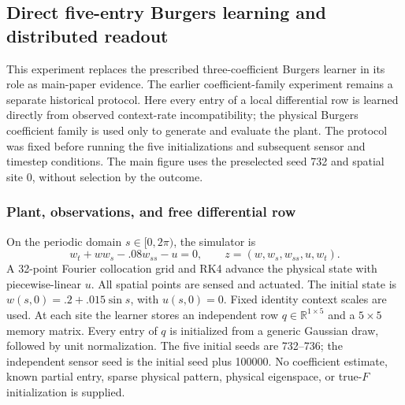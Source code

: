 \subsection{Direct five-entry Burgers learning and distributed readout}
\label{sec:direct_burgers_protocol}

This experiment replaces the prescribed three-coefficient Burgers learner in
its role as main-paper evidence. The earlier coefficient-family experiment
remains a separate historical protocol. Here every entry of a local differential
row is learned directly from observed context-rate incompatibility; the physical
Burgers coefficient family is used only to generate and evaluate the plant.
The protocol was fixed before running the five initializations and subsequent
sensor and timestep conditions. The main figure uses the preselected seed 732
and spatial site 0, without selection by the outcome.

\subsubsection{Plant, observations, and free differential row}
On the periodic domain $s\in[0,2\pi)$, the simulator is
\begin{equation}
 w_t+w w_s-.08w_{ss}-u=0,
 \qquad z=(w,w_s,w_{ss},u,w_t).
 \label{eq:direct_burgers_plant}
\end{equation}
A 32-point Fourier collocation grid and RK4 advance the physical state with
piecewise-linear $u$. All spatial points are sensed and actuated. The initial
state is $w(s,0)=.2+.015\sin s$, with $u(s,0)=0$. Fixed identity context scales
are used. At each site the learner stores an independent row
$q\in\mathbb R^{1\times5}$ and a $5\times5$ memory matrix. Every entry of $q$
is initialized from a generic Gaussian draw, followed by unit normalization.
The five initial seeds are 732--736; the independent sensor seed is the initial
seed plus 100000. No coefficient estimate, known partial entry, sparse physical
pattern, physical eigenspace, or true-$F$ initialization is supplied.

